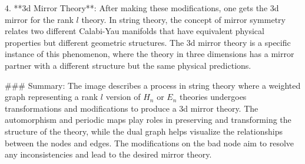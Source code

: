 4. **3d Mirror Theory**: After making these modifications, one gets the 3d mirror for the rank \( l \) theory. In string theory, the concept of mirror symmetry relates two different Calabi-Yau manifolds that have equivalent physical properties but different geometric structures. The 3d mirror theory is a specific instance of this phenomenon, where the theory in three dimensions has a mirror partner with a different structure but the same physical predictions.

### Summary:
The image describes a process in string theory where a weighted graph representing a rank \( l \) version of \( H_n \) or \( E_n \) theories undergoes transformations and modifications to produce a 3d mirror theory. The automorphism and periodic maps play roles in preserving and transforming the structure of the theory, while the dual graph helps visualize the relationships between the nodes and edges. The modifications on the bad node aim to resolve any inconsistencies and lead to the desired mirror theory.